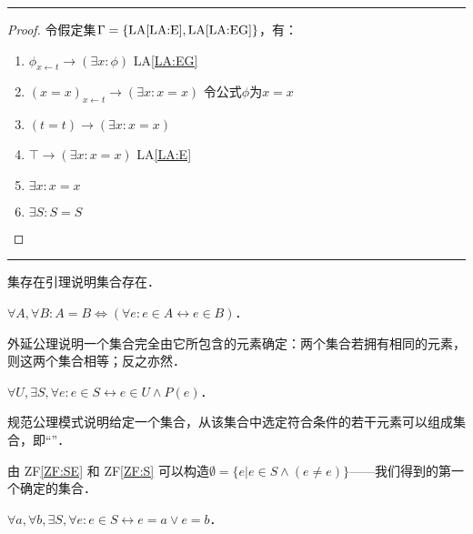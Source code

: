 \hrule
\begin{proof}
    令假定集$ \Gamma = \{ \text{LA\ref{LA:E}}, \text{LA\ref{LA:EG}} \} $，有：
    \begin{enumerate}
        \item $ \phi_{x\gets{}t} \to (\exists x: \phi) $     \hfill LA\ref{LA:EG}
        \item $ (x = x)_{x\gets{}t} \to (\exists x: x = x) $ \hfill 令公式$\phi$为$ x = x $
        \item $ (t = t) \to (\exists x: x = x) $
        \item $ \top \to (\exists x: x = x) $                \hfill LA\ref{LA:E}
        \item $ \exists x: x = x $
        \item $ \exists S: S = S $                           \qedhere
    \end{enumerate}
\end{proof}
\hrule
\vspace{2ex}

集存在引理说明集合存在．

\begin{ZermeloFraenkelAxioms}\label{ZF:E}
    $ \forall A, \forall B: A = B \iff (\forall e: e \in A \leftrightarrow e \in B) $．
\end{ZermeloFraenkelAxioms}

外延公理说明一个集合完全由它所包含的元素确定：两个集合若拥有相同的元素，则这两个集合相等；反之亦然．

\begin{ZermeloFraenkelAxioms}\label{ZF:S}
    $ \forall U, \exists S, \forall e: e \in S \leftrightarrow e \in U \land P(e) $．
\end{ZermeloFraenkelAxioms}

规范公理模式说明给定一个集合，从该集合中选定符合条件的若干元素可以组成集合，即``''．

由 ZF\ref{ZF:SE} 和 ZF\ref{ZF:S} 可以构造$ \emptyset = \{ e | e \in S \land (e \neq e) \} $——我们得到的第一个确定的集合．

\begin{ZermeloFraenkelAxioms}\label{ZF:P}
    $ \forall a, \forall b, \exists S, \forall e: e \in S \leftrightarrow e = a \lor e = b $．
\end{ZermeloFraenkelAxioms}

